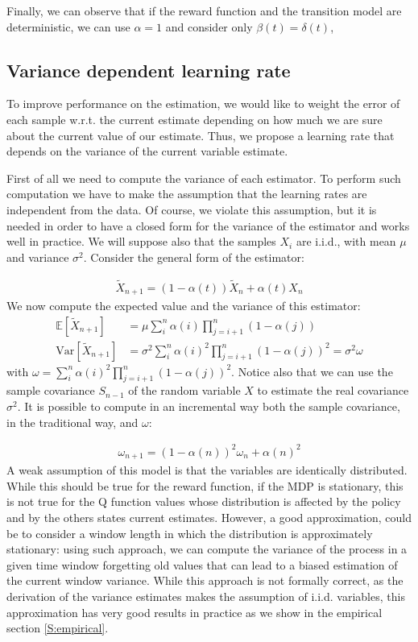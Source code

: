 \documentclass[conference]{IEEEtran}
\begin{document}
Finally, we can observe that if the reward function and the transition model are deterministic, we can use $\alpha=1$ and consider only $\beta(t)=\delta(t)$,

\subsection{Variance dependent learning rate}
To improve performance on the estimation, we would like to weight the error of each sample w.r.t. the current estimate depending on how much we are sure about the current value of our estimate. Thus, we propose a learning rate that depends on the variance of the current variable estimate.

First of all we need to compute the variance of each estimator. To perform such computation we have to make the assumption that the learning rates are independent from the data. Of course, we violate this assumption, but it is needed in order to have a closed form for the variance of the estimator and works well in practice. We will suppose also that the samples $X_i$ are i.i.d., with mean $\mu$ and variance $\sigma^2$. Consider the general form of the estimator:

\begin{align}
 \widetilde{X}_{n+1} = (1-\alpha(t))\widetilde{X}_{n}+\alpha(t)X_{n}
\end{align}
We now compute the expected value and the variance of this estimator:
\begin{align}
 \mathbb{E}\left[\widetilde{X}_{n+1}\right]& = \mu\sum_i^n \alpha(i) \prod_{j=i+1}^{n} \left(1-\alpha(j)\right)\\
 \mathrm{Var}\left[\widetilde{X}_{n+1}\right]& = \sigma^2\sum_i^n \alpha(i)^2 \prod_{j=i+1}^{n} \left(1-\alpha(j)\right)^2 = \sigma^2\omega
\end{align}
with $\omega=\sum_i^n \alpha(i)^2 \prod_{j=i+1}^{n} \left(1-\alpha(j)\right)^2$. Notice also that we can use the sample covariance $S_{n-1}$ of the random variable $X$ to estimate the real covariance $\sigma^2$. It is possible to compute in an incremental way both the sample covariance, in the traditional way, and $\omega$:

\begin{align}
 \omega_{n+1}=(1-\alpha(n))^2\omega_n+\alpha(n)^2
\end{align}
A weak assumption of this model is that the variables are identically distributed. While this should be true for the reward function, if the MDP is stationary, this is not true for the Q function values whose distribution is affected by the policy and by the others states current estimates. However, a good approximation, could be to consider a window length in which the distribution is approximately stationary: using such approach, we can compute the variance of the process in a given time window forgetting old values that can lead to a biased estimation of the current window variance. While this approach is not formally correct, as the derivation of the variance estimates makes the assumption of i.i.d. variables, this approximation has very good results in practice as we show in the empirical section \ref{S:empirical}.
\end{document}

